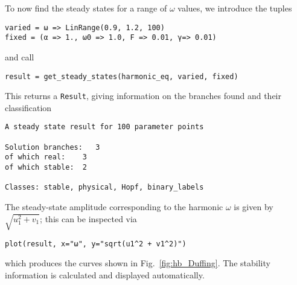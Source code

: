 To now find the steady states for a range of $\omega$ values, we introduce the tuples
%
\begin{lstlisting}[numbers=none]
varied = ω => LinRange(0.9, 1.2, 100)
fixed = (α => 1., ω0 => 1.0, F => 0.01, γ=> 0.01)
\end{lstlisting}
%
and call
%
\begin{lstlisting}[numbers=none]
result = get_steady_states(harmonic_eq, varied, fixed)
\end{lstlisting}
%
This returns a \texttt{Result}, giving information on the branches found and their classification
\begin{lstlisting}[numbers=none, basicstyle=\scriptsize\ttfamily, keywordstyle=\color{black}]
A steady state result for 100 parameter points

Solution branches:   3
of which real:    3
of which stable:  2

Classes: stable, physical, Hopf, binary_labels
\end{lstlisting}
The steady-state amplitude corresponding to the harmonic $\omega$ is given by $\sqrt{u_1^2+v_1}$; this can be inspected via
%
\begin{lstlisting}[numbers=none]
plot(result, x="ω", y="sqrt(u1^2 + v1^2)")
\end{lstlisting}
%
which produces the curves shown in Fig.~\ref{fig:hb_Duffing}. The stability information is calculated and displayed automatically. 
%

